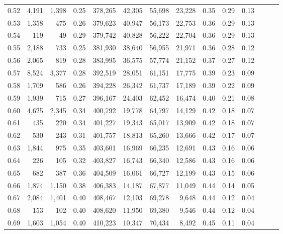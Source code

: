 \begin{tabular}{rrrrrrrrrrrrrr}
0.52 &   4,191 &  1,398 &  0.25 &  378,265 &   42,305 &  55,698 &  23,228 &  0.35 &  0.29 &      0.13 \\
0.53 &   1,358 &    475 &  0.26 &  379,623 &   40,947 &  56,173 &  22,753 &  0.36 &  0.29 &      0.13 \\
0.54 &     119 &     49 &  0.29 &  379,742 &   40,828 &  56,222 &  22,704 &  0.36 &  0.29 &      0.13 \\
0.55 &   2,188 &    733 &  0.25 &  381,930 &   38,640 &  56,955 &  21,971 &  0.36 &  0.28 &      0.12 \\
0.56 &   2,065 &    819 &  0.28 &  383,995 &   36,575 &  57,774 &  21,152 &  0.37 &  0.27 &      0.12 \\
0.57 &   8,524 &  3,377 &  0.28 &  392,519 &   28,051 &  61,151 &  17,775 &  0.39 &  0.23 &      0.09 \\
0.58 &   1,709 &    586 &  0.26 &  394,228 &   26,342 &  61,737 &  17,189 &  0.39 &  0.22 &      0.09 \\
0.59 &   1,939 &    715 &  0.27 &  396,167 &   24,403 &  62,452 &  16,474 &  0.40 &  0.21 &      0.08 \\
0.60 &   4,625 &  2,345 &  0.34 &  400,792 &   19,778 &  64,797 &  14,129 &  0.42 &  0.18 &      0.07 \\
0.61 &     435 &    220 &  0.34 &  401,227 &   19,343 &  65,017 &  13,909 &  0.42 &  0.18 &      0.07 \\
0.62 &     530 &    243 &  0.31 &  401,757 &   18,813 &  65,260 &  13,666 &  0.42 &  0.17 &      0.07 \\
0.63 &   1,844 &    975 &  0.35 &  403,601 &   16,969 &  66,235 &  12,691 &  0.43 &  0.16 &      0.06 \\
0.64 &     226 &    105 &  0.32 &  403,827 &   16,743 &  66,340 &  12,586 &  0.43 &  0.16 &      0.06 \\
0.65 &     682 &    387 &  0.36 &  404,509 &   16,061 &  66,727 &  12,199 &  0.43 &  0.15 &      0.06 \\
0.66 &   1,874 &  1,150 &  0.38 &  406,383 &   14,187 &  67,877 &  11,049 &  0.44 &  0.14 &      0.05 \\
0.67 &   2,084 &  1,401 &  0.40 &  408,467 &   12,103 &  69,278 &   9,648 &  0.44 &  0.12 &      0.04 \\
0.68 &     153 &    102 &  0.40 &  408,620 &   11,950 &  69,380 &   9,546 &  0.44 &  0.12 &      0.04 \\
0.69 &   1,603 &  1,054 &  0.40 &  410,223 &   10,347 &  70,434 &   8,492 &  0.45 &  0.11 &      0.04 \\

\end{tabular}
